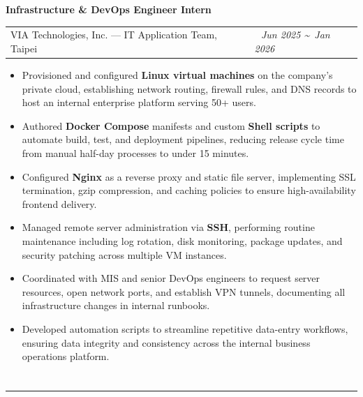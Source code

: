 \documentclass{article}
\makeatletter
\newcommand{\TitleShadow}[1]{
  \hspace{-0.4cm}
  \shadowtext{\fontsize{16pt}{22pt}\selectfont {\StrLeft{#1}{1}}}%
  \shadowtext{\fontsize{12pt}{18pt}\selectfont \hspace{-0.5em}\StrGobbleLeft{#1}{1}}%
}
\newenvironment{workexperience}[4]{
    \noindent
    \large \textbf{#1} \\ [0.1cm]
    \normalsize 
    \begin{tabular}{@{}l@{\hspace{0.5cm}}l@{}}
      #2, #3 & \textcolor{customblue}{\textit{\textsf{#4}}}  
    \end{tabular} 
    \vspace{-0.15cm}
    \fontsize{9.5pt}{12pt}\selectfont
    \begin{itemize}[leftmargin=0.6cm, labelsep=0.3cm, itemsep=-0.05cm]
}{
    \end{itemize}
}
\makeatother
\begin{document}
\begin{workexperience}{Infrastructure \& DevOps Engineer Intern}{VIA Technologies, Inc. — IT Application Team}{Taipei}{\textbar\ \,Jun 2025 \textasciitilde\ Jan 2026}
    \item Provisioned and configured \textbf{Linux virtual machines} on the company's private cloud, establishing network routing, firewall rules, and DNS records to host an internal enterprise platform serving 50+ users.

    \item Authored \textbf{Docker Compose} manifests and custom \textbf{Shell scripts} to automate build, test, and deployment pipelines, reducing release cycle time from manual half-day processes to under 15 minutes.

    \item Configured \textbf{Nginx} as a reverse proxy and static file server, implementing SSL termination, gzip compression, and caching policies to ensure high-availability frontend delivery.

    \item Managed remote server administration via \textbf{SSH}, performing routine maintenance including log rotation, disk monitoring, package updates, and security patching across multiple VM instances.

    \item Coordinated with MIS and senior DevOps engineers to request server resources, open network ports, and establish VPN tunnels, documenting all infrastructure changes in internal runbooks.

    \item Developed automation scripts to streamline repetitive data-entry workflows, ensuring data integrity and consistency across the internal business operations platform.
\end{workexperience}

\vspace{-0.7cm}

\section*{\TitleShadow{PROJECTS}}
\vspace{-0.5cm}
\noindent\rule{\textwidth}{0.4pt} 
\vspace{-0.25cm}
\end{document}
